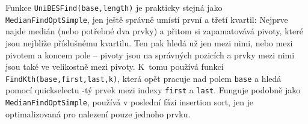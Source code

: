         Funkce {\tt UniBESFind(base,length)} je prakticky stejná jako {\tt MedianFindOptSimple}, jen ještě správně umístí první a třetí kvartil: Nejprve najde medián (nebo potřebné dva prvky) a přitom si zapamatovává pivoty, které jsou nejblíže příslušnému kvartilu. Ten pak hledá už jen mezi nimi, nebo mezi pivotem a koncem pole -- pivoty jsou na správných pozicích a prvky mezi nimi jsou také ve velikostně mezi pivoty. K~tomu používá funkci {\tt FindKth(base,first,last,k)}, která opět pracuje nad polem {\tt base} a hledá pomocí quickselectu \kk-tý prvek mezi indexy {\tt first} a {\tt last}. Funguje podobně jako {\tt MedianFindOptSimple}, používá v poslední fázi insertion sort, jen je optimalizovaná pro nalezení pouze jednoho prvku.
























